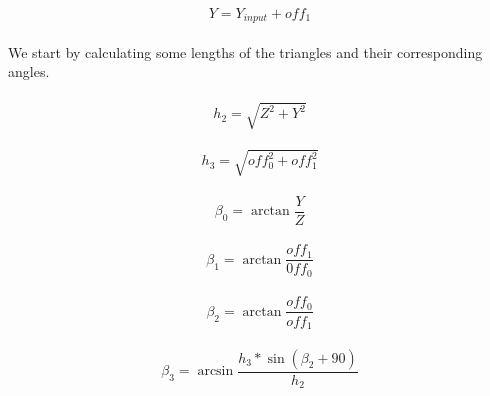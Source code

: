\documentclass{article}
\begin{document}
    \paragraph{}
    \begin{equation}
        Y = Y_{input} + off_1
    \end{equation}

    \paragraph{}
    We start by calculating some lengths of the triangles and their corresponding angles.

    \paragraph{}
    \begin{equation}
        h_2 = \sqrt{Z^2 + Y^2}
    \end{equation}

    \paragraph{}
    \begin{equation}
        h_3 = \sqrt{off_0^2 + off_1^2}
    \end{equation}

    \paragraph{}
    \begin{equation}
        \beta_0 = \arctan \frac{Y}{Z}
    \end{equation}

    \paragraph{}
    \begin{equation}
        \beta_1 = \arctan \frac{off_1}{0ff_0}
    \end{equation}

    \paragraph{}
    \begin{equation}
        \beta_2 = \arctan \frac{off_0}{off_1}
    \end{equation}

    \paragraph{}
    \begin{equation}
        \beta_3 = \arcsin \frac{h_3 * \sin(\beta_2 + 90)}{h_2}
    \end{equation}
\end{document}
